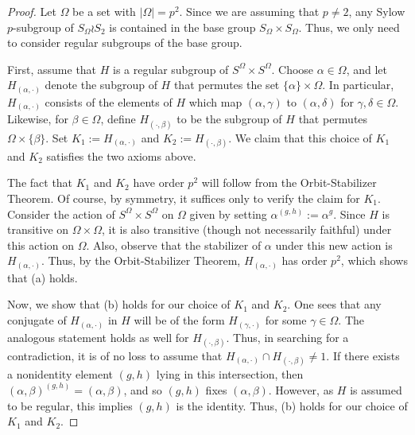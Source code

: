 \documentclass[12pt]{amsart}
\theoremstyle{definition}
\begin{document}
\begin{proof}
	Let $\Omega$ be a set with $|\Omega| = p^2$. Since we are assuming that $p \neq 2$, any Sylow $p$-subgroup of $S_{\Omega} \wr S_2$ is contained in the base group $S_{\Omega} \times S_{\Omega}$. Thus, we only need to consider regular subgroups of the base group. 
	
	First, assume that $H$ is a regular subgroup of $S^{\Omega} \times S^{\Omega}$. Choose $\alpha \in \Omega$, and let $H_{(\alpha, \cdot)}$ denote the subgroup of $H$ that permutes the set $\{\alpha\} \times \Omega$. In particular, $H_{(\alpha,\cdot)}$ consists of the elements of $H$ which map $(\alpha,\gamma)$ to $(\alpha,\delta)$ for $\gamma,\delta \in \Omega$. Likewise, for $\beta \in \Omega$, define $H_{(\cdot, \beta)}$ to be the subgroup of $H$ that permutes $\Omega \times \{\beta\}$. Set $K_1 := H_{(\alpha,\cdot)}$ and $K_2 := H_{(\cdot,\beta)}$. We claim that this choice of $K_1$ and $K_2$ satisfies the two axioms above.
	
	The fact that $K_1$ and $K_2$ have order $p^2$ will follow from the Orbit-Stabilizer Theorem. Of course, by symmetry, it suffices only to verify the claim for $K_1$. Consider the action of $S^\Omega \times S^\Omega$ on $\Omega$ given by setting $\alpha^{(g,h)} := \alpha^g$. Since $H$ is transitive on $\Omega \times \Omega$, it is also transitive (though not necessarily faithful) under this action on $\Omega$. Also, observe that the stabilizer of $\alpha$ under this new action is $H_{(\alpha,\cdot)}$. Thus, by the Orbit-Stabilizer Theorem, $ H_{(\alpha,\cdot)}$ has order $p^2$, which shows that (a) holds.
	
	Now, we show that (b) holds for our choice of $K_1$ and $K_2$. One sees that any conjugate of $H_{(\alpha,\cdot)}$ in $H$ will be of the form $H_{(\gamma,\cdot)}$ for some $\gamma \in \Omega$. The analogous statement holds as well for $H_{(\cdot,\beta)}$. Thus, in searching for a contradiction, it is of no loss to assume that $H_{(\alpha,\cdot)} \cap H_{(\cdot,\beta)} \neq 1$. If there exists a nonidentity element $(g,h)$ lying in this intersection, then $(\alpha,\beta)^{(g,h)} = (\alpha,\beta)$, and so $(g,h)$ fixes $(\alpha,\beta)$. However, as $H$ is assumed to be regular, this implies $(g,h)$ is the identity. Thus, (b) holds for our choice of $K_1$ and $K_2$. 
	

\end{proof}
\end{document}
